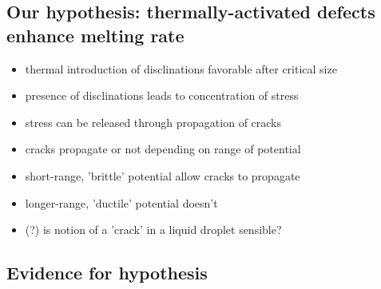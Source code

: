 \documentclass{umthesis}          %
\begin{document}
\subsection{Our hypothesis:  thermally-activated defects enhance melting rate}
\label{sec-3.1.3}

\begin{itemize}

\item thermal introduction of disclinations favorable after critical size\\
\label{sec-3.1.3.1}


\item presence of disclinations leads to concentration of stress\\
\label{sec-3.1.3.2}


\item stress can be released through propagation of cracks\\
\label{sec-3.1.3.3}


\item cracks propagate or not depending on range of potential\\
\label{sec-3.1.3.4}


\item short-range, 'brittle' potential allow cracks to propagate\\
\label{sec-3.1.3.5}


\item longer-range, 'ductile' potential doesn't\\
\label{sec-3.1.3.6}


\item (?) is notion of a 'crack' in a liquid droplet sensible?\\
\label{sec-3.1.3.7}

\end{itemize} %
\subsection{Evidence for hypothesis}
\label{sec-3.1.4}
\end{document}
